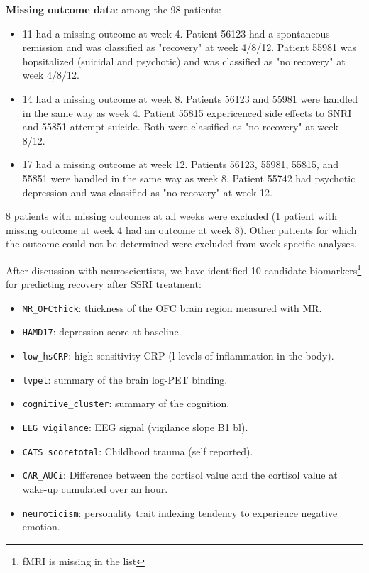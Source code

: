 \documentclass[12pt]{article}
\begin{document}
\noindent \textbf{Missing outcome data}: among the 98 patients:
\begin{itemize}
\item 11 had a missing outcome at week 4. Patient 56123 had a spontaneous
remission and was classified as "recovery" at week 4/8/12. Patient
55981 was hopsitalized (suicidal and psychotic) and was classified
as "no recovery" at week 4/8/12.
\item 14 had a missing outcome at week 8. Patients 56123 and 55981 were
handled in the same way as week 4. Patient 55815 expericenced side effects to
SNRI and 55851 attempt suicide. Both were classified as "no
recovery" at week 8/12.
\item 17 had a missing outcome at week 12. Patients 56123, 55981, 55815,
and 55851 were handled in the same way as week 8. Patient 55742 had psychotic
depression and was classified as "no recovery" at week 12.
\end{itemize}
8 patients with missing outcomes at all weeks were excluded (1 patient
with missing outcome at week 4 had an outcome at week 8). Other
patients for which the outcome could not be determined were excluded
from week-specific analyses.

\bigskip


After discussion with neuroscientists, we have identified 10 candidate
biomarkers\footnote{fMRI is missing in the list} for predicting recovery after SSRI treatment:
\begin{itemize}
\item \texttt{MR\_OFCthick}: thickness of the OFC brain region measured with MR.
\item \texttt{HAMD17}: depression score at baseline.
\item \texttt{low\_hsCRP}: high sensitivity CRP (l levels of inflammation in the body).
\item \texttt{lvpet}: summary of the brain log-PET binding.
\item \texttt{cognitive\_cluster}: summary of the cognition.
\item \texttt{EEG\_vigilance}: EEG signal (vigilance slope B1 bl).
\item \texttt{CATS\_scoretotal}: Childhood trauma (self reported).
\item \texttt{CAR\_AUCi}: Difference between the cortisol value and the cortisol value at wake-up cumulated over an hour.
\item \texttt{neuroticism}: personality trait indexing tendency to experience negative emotion.
\end{itemize}
\end{document}
